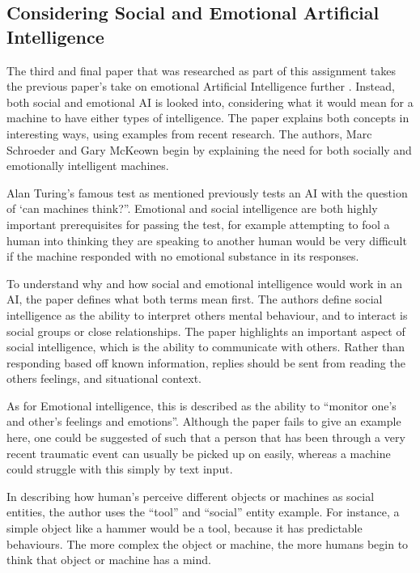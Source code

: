 \documentclass[article]{IEEEtran}
\begin{document}
\subsection{Considering Social and Emotional Artificial Intelligence}
The third and final paper that was researched as part of this assignment takes the previous paper’s take on emotional Artificial Intelligence further \cite{ethicsSocial}. Instead, both social and emotional AI is looked into, considering what it would mean for a machine to have either types of intelligence. The paper explains both concepts in interesting ways, using examples from recent research. The authors, Marc Schroeder and Gary McKeown begin by explaining the need for both socially and emotionally intelligent machines. \par
Alan Turing’s famous test as mentioned previously tests an AI with the question of ‘can machines think?”. Emotional and social intelligence are both highly important prerequisites for passing the test, for example attempting to fool a human into thinking they are speaking to another human would be very difficult if the machine responded with no emotional substance in its responses.	\par
To understand why and how social and emotional intelligence would work in an AI, the paper defines what both terms mean first. The authors define social intelligence as the ability to interpret others mental behaviour, and to interact is social groups or close relationships. The paper highlights an important aspect of social intelligence, which is the ability to communicate with others. Rather than responding based off known information, replies should be sent from reading the others feelings, and situational context.\par
As for Emotional intelligence, this is described as the ability to “monitor one’s and other’s feelings and emotions”. Although the paper fails to give an example here, one could be suggested of such that a person that has been through a very recent traumatic event can usually be picked up on easily, whereas a machine could struggle with this simply by text input. \par
In describing how human’s perceive different objects or machines as social entities, the author uses the “tool” and “social” entity example. For instance, a simple object like a hammer would be a tool, because it has predictable behaviours. The more complex the object or machine, the more humans begin to think that object or machine has a mind. \par
\end{document}
